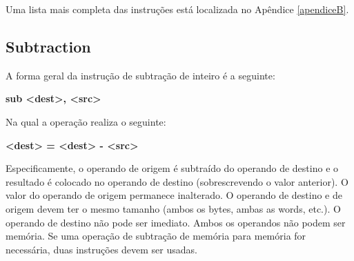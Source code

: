 \begin{table}[ht]
	\begin{center}
	\end{center}
	\caption{Instruções de adição.}
	\label{tab:adc}
\end{table}

Uma lista mais completa das instruções está localizada no Apêndice \ref{apendiceB}.

\subsection{Subtraction}

A forma geral da instrução de subtração de inteiro é a seguinte:
\begin{center}
	\textbf{sub <dest>, <src>}
\end{center}

Na qual a operação realiza o seguinte:
\begin{center}
	\textbf{<dest> = <dest> - <src>}
\end{center}

Especificamente, o operando de origem é subtraído do operando de destino e o resultado é colocado no operando de destino (sobrescrevendo o valor anterior). O valor do operando de origem permanece inalterado. O operando de destino e de origem devem ter o mesmo tamanho (ambos os bytes, ambas as words, etc.). O operando de destino não pode ser imediato. Ambos os operandos não podem ser memória. Se uma operação de subtração de memória para memória for necessária, duas instruções devem ser usadas.

